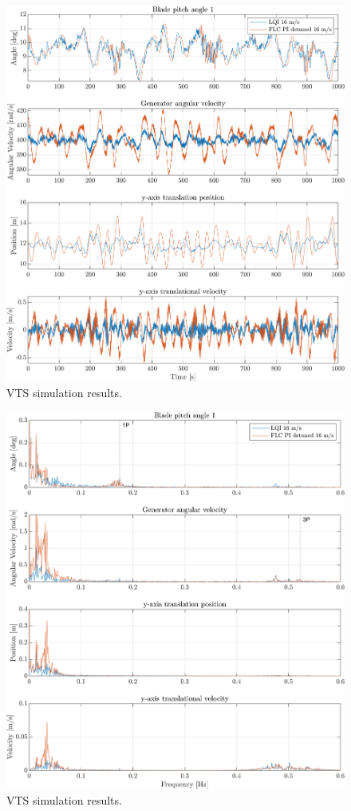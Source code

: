 \begin{figure}[ht]
	\centering
	\includegraphics[width=0.7\linewidth]{Graphics/TestResults/VTSplotting/10_th_w_py_vy.png}
	\caption{VTS simulation results.}
	\label{fig:vts_10_th_w_py_vy}
\end{figure}

\begin{figure}[ht]
	\centering
	\includegraphics[width=0.7\linewidth]{Graphics/TestResults/VTSplotting/11_fft_th_w_py_vy.png}
	\caption{VTS simulation results.}
	\label{fig:vts_11_fft_th_w_py_vy}
\end{figure}


